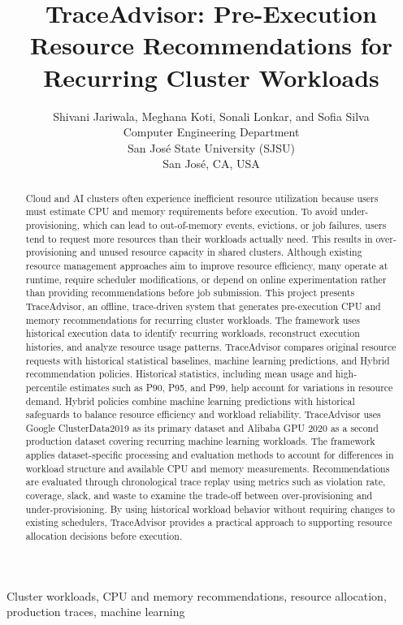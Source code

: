 \documentclass{IEEEtran}
\title{TraceAdvisor: Pre-Execution Resource Recommendations for Recurring Cluster Workloads}
\author{Shivani Jariwala, Meghana Koti, Sonali Lonkar, and Sofia Silva\\
Computer Engineering Department\\
San Jos\'{e} State University (SJSU)\\
San Jos\'{e}, CA, USA}
\begin{document}
\maketitle
\begin{abstract}
Cloud and AI clusters often experience inefficient resource utilization because users must estimate CPU and memory requirements before execution. To avoid under-provisioning, which can lead to out-of-memory events, evictions, or job failures, users tend to request more resources than their workloads actually need. This results in over-provisioning and unused resource capacity in shared clusters. Although existing resource management approaches aim to improve resource efficiency, many operate at runtime, require scheduler modifications, or depend on online experimentation rather than providing recommendations before job submission.
This project presents TraceAdvisor, an offline, trace-driven system that generates pre-execution CPU and memory recommendations for recurring cluster workloads. The framework uses historical execution data to identify recurring workloads, reconstruct execution histories, and analyze resource usage patterns. TraceAdvisor compares original resource requests with historical statistical baselines, machine learning predictions, and Hybrid recommendation policies. Historical statistics, including mean usage and high-percentile estimates such as P90, P95, and P99, help account for variations in resource demand. Hybrid policies combine machine learning predictions with historical safeguards to balance resource efficiency and workload reliability.
TraceAdvisor uses Google ClusterData2019 as its primary dataset and Alibaba GPU 2020 as a second production dataset covering recurring machine learning workloads. The framework applies dataset-specific processing and evaluation methods to account for differences in workload structure and available CPU and memory measurements. Recommendations are evaluated through chronological trace replay using metrics such as violation rate, coverage, slack, and waste to examine the trade-off between over-provisioning and under-provisioning. By using historical workload behavior without requiring changes to existing schedulers, TraceAdvisor provides a practical approach to supporting resource allocation decisions before execution.
\end{abstract}

\begin{IEEEkeywords}
Cluster workloads, CPU and memory recommendations,
resource allocation, production traces, machine learning
\end{IEEEkeywords}
\end{document}

